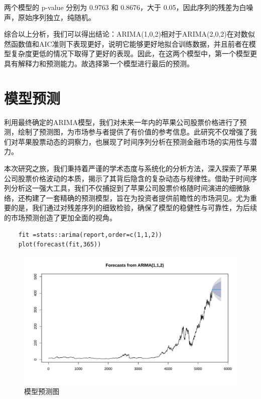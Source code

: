 \documentclass{article} %
\begin{document}
两个模型的 p-value 分别为 0.9763 和 0.8676，大于 0.05，因此序列的残差为白噪声，原始序列独立，纯随机。

综合以上分析，我们可以得出结论：ARIMA(1,0,2)相对于ARIMA(2,0,2)在对数似然函数值和AIC准则下表现更好，说明它能够更好地拟合训练数据，并且前者在模型复杂度更低的情况下取得了更好的表现。因此，在这两个模型中，第一个模型更具有解释力和预测能力。故选择第一个模型进行最后的预测。




\section{模型预测}

利用最终确定的ARIMA模型，我们对未来一年内的苹果公司股票价格进行了预测，绘制了预测图，为市场参与者提供了有价值的参考信息。此研究不仅增强了我们对苹果股票动态的洞察力，也展现了时间序列分析在预测金融市场的实用性与潜力。

本次研究之旅，我们秉持着严谨的学术态度与系统化的分析方法，深入探索了苹果公司股票价格波动的本质，揭示了其背后隐含的复杂动态与规律性。借助于时间序列分析这一强大工具，我们不仅捕捉到了苹果公司股票价格随时间演进的细微脉络，还构建了一套精确的预测模型，旨在为投资者提供前瞻性的市场洞见。尤为重要的是，我们通过对残差序列的细致检验，确保了模型的稳健性与可靠性，为后续的市场预测创造了更加全面的视角。

\begin{lstlisting}
    fit =stats::arima(report,order=c(1,1,2))
    plot(forecast(fit,365))
\end{lstlisting}

\begin{figure}[H] %
	\centering %
	\includegraphics[width=\textwidth]{pic/forecast.pdf} %
	\caption{模型预测图} %
	\label{} %
\end{figure}
\FloatBarrier
\end{document}

